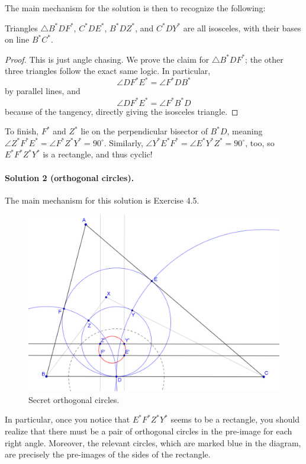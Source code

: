 \documentclass{scrartcl}
\providecommand{\dg}{^\circ}
\begin{document}
The main mechanism for the solution is then to recognize the following:
\begin{claim}
	Triangles $\triangle B^\ast DF^\ast$, $C^\ast DE^\ast$,
	$B^\ast DZ^\ast$, and $C^\ast DY^\ast$ are all isosceles,
	with their bases on line $B^\ast C^\ast$.
\end{claim}
\begin{proof}
	This is just angle chasing. We prove the claim for
	$\triangle B^\ast DF^\ast$; the other three triangles
	follow the exact same logic.
	In particular,
	\[\angle DF^\ast E^\ast = \angle F^\ast DB^\ast\]
	by parallel lines, and
	\[\angle DF^\ast E^\ast = \angle F^\ast B^\ast D\]
	because of the tangency, directly giving the isosceles triangle.
\end{proof}

To finish, $F^\ast$ and $Z^\ast$ lie on the perpendicular bisector of
$B^\ast D$, meaning
$\angle Z^\ast F^\ast E^\ast = \angle F^\ast Z^\ast Y^\ast = 90\dg$.
Similarly,
$\angle Y^\ast E^\ast F^\ast = \angle E^\ast Y^\ast Z^\ast = 90\dg$,
too, so $E^\ast F^\ast Z^\ast Y^\ast$ is a rectangle, and thus cyclic!

\paragraph{Solution 2 (orthogonal circles).} The main mechanism
for this solution is Exercise 4.5.

\begin{figure}[h]
	\centering
	\includegraphics[width=0.8\linewidth]{inversion_twoIncircles_solution2}
	\caption{Secret orthogonal circles.}
	\label{fig:inversiontwoincirclessolution2}
\end{figure}

In particular, once you notice that $E^\ast F^\ast Z^\ast Y^\ast$
seems to be a rectangle, you should realize that there must be
a pair of orthogonal circles in the pre-image for each right angle.
Moreover, the relevant circles, which are marked blue in the diagram,
are precisely the pre-images of the sides of the rectangle.
\end{document}
